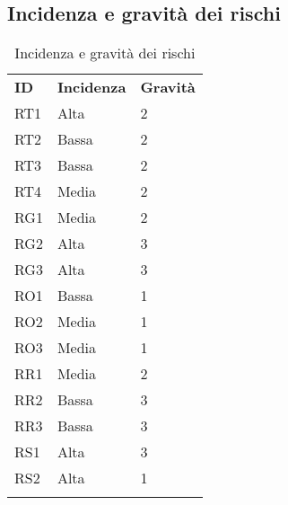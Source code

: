 \subsection{Incidenza e gravità dei rischi}
	\begin{longtable} {
		>{}p{24mm} 
		>{}p{32mm}
		>{}p{32mm} 
		}
	\rowcolor{gray!50}
		\textbf{ID} & \textbf{Incidenza} & \textbf{Gravità}	\TBstrut \\
		RT1 & Alta & 2 \TBstrut \\ [2mm]
		RT2 & Bassa & 2 \TBstrut \\ [2mm]
		RT3 & Bassa & 2 \TBstrut \\ [2mm]
		RT4 & Media & 2 \TBstrut \\ [2mm]
		RG1 & Media & 2 \TBstrut \\ [2mm]
		RG2 & Alta & 3 \TBstrut \\ [2mm]
		RG3 & Alta & 3 \TBstrut \\ [2mm]
		RO1 & Bassa & 1 \TBstrut \\ [2mm]
		RO2 & Media & 1 \TBstrut \\ [2mm]
		RO3 & Media & 1 \TBstrut \\ [2mm]
		RR1 & Media & 2 \TBstrut \\ [2mm]
		RR2 & Bassa & 3 \TBstrut \\ [2mm]
		RR3 & Bassa & 3 \TBstrut \\ [2mm]
		RS1 & Alta & 3 \TBstrut \\ [2mm]
		RS2 & Alta & 1 \TBstrut \\ [2mm]
		\rowcolor{white}
		\caption{Incidenza e gravità dei rischi}
	\end{longtable}
